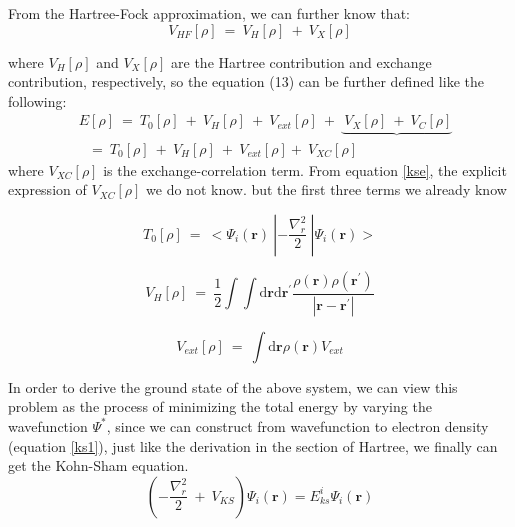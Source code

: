 \documentclass[a4paper, 12pt, titlepage,oneside,drop]{kthesis}
\begin{document}
\noindent From the Hartree-Fock approximation, we can further know that:
\begin{equation}
 V_\textit{HF}[\rho] \ = \ V_\textit{H}[\rho] \ + \ V_\textit{X}[\rho] 
\end{equation}

\noindent where $V_\textit{H}[\rho]$ and $ V_\textit{X}[\rho] $ are the Hartree contribution and exchange contribution, respectively, so the equation (13) can be further defined like
 the following:
\begin{equation}\label{ccc}
\begin{split}
&E[\rho]\ = \ T_{0}[\rho] \ + \ V_\textit{H}[\rho] \ + \ V_\textit{ext}[\rho] \ + \ \underbrace{\ V_\textit{X}[\rho]  \ + \ V_\textit{C}[\rho]}  \\
&\ \ \ = \ T_{0}[\rho] \ + \ V_\textit{H}[\rho] \ + \ V_\textit{ext}[\rho] + \ V_\textit{XC}[\rho]
\end{split}\end{equation}
\noindent where $V_\textit{XC}[\rho]$  is the exchange-correlation term. From equation \ref{kse}, the explicit expression of $V_\textit{XC}[\rho]$ we do not know. 
 but the first three terms we already know

\begin{equation}
 T_{0}[\rho]\ = \ < \Psi_{i}(\textbf{r}) \ | -\frac{\nabla^{2}_{r}}{2} \ | \Psi_{i}(\textbf{r}) >
\end{equation}

\begin{equation}
V_\textit{H}[\rho] \ = \ \frac{1}{2} \int \int \mathrm{d} {\textbf{r}} \mathrm{d}{\textbf{r}^{\prime}} \frac{\rho({\textbf{r}})\rho(\textbf{r}^{\prime})}{|{\textbf{r}}-{\textbf{r}}^{\prime}|} 
\end{equation}


\begin{equation}
V_\textit{ext}[\rho]\ = \ \int \mathrm{d}{\textbf{r}} \rho(\textbf{r}) V_\textit{ext} 
\end{equation}

\noindent In order to derive the ground state of the above system, we can view this problem as the process of minimizing the total energy by varying the wavefunction $\Psi^*$, since
we can construct from wavefunction to electron density (equation \ref{ks1}), just like the derivation in the section of Hartree, we finally can get the Kohn-Sham equation.
\begin{equation}\label{aaa}
 (-\frac{\nabla^{2}_{r}}{2}\ + \ V_\textit{KS}) \Psi_{\textit{i}}(\textbf{r}) = E_{\textit{ks}}^{\textit{i}} \Psi_{\textit{i}}(\textbf{r})
\end{equation}
\end{document}
